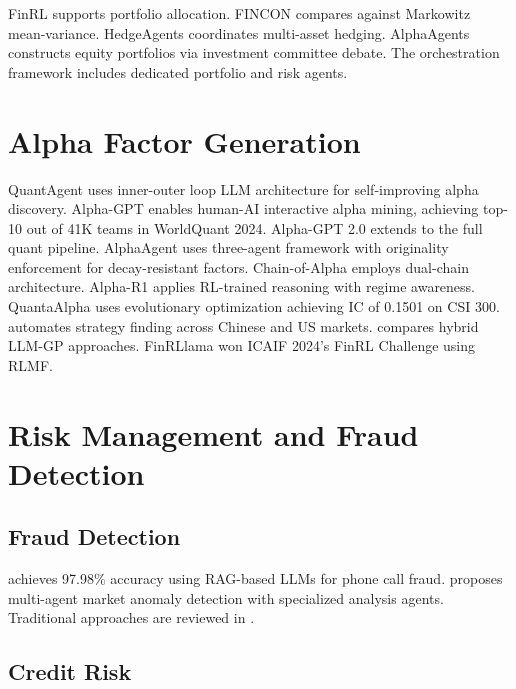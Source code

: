 \documentclass[12pt]{report}
\begin{document}
FinRL \citep{liu2021finrl} supports portfolio allocation. FINCON \citep{yu2024fincon} compares against Markowitz mean-variance. HedgeAgents \citep{li2025hedgeagents} coordinates multi-asset hedging. AlphaAgents \citep{zhao2025alphaagents} constructs equity portfolios via investment committee debate. The orchestration framework \citep{li2025orchestration} includes dedicated portfolio and risk agents.

\section{Alpha Factor Generation}

QuantAgent \citep{wang2024quantagent} uses inner-outer loop LLM architecture for self-improving alpha discovery. Alpha-GPT \citep{wang2025alphagpt} enables human-AI interactive alpha mining, achieving top-10 out of 41K teams in WorldQuant 2024. Alpha-GPT 2.0 \citep{yuan2024alphagpt2} extends to the full quant pipeline. AlphaAgent \citep{tang2025alphaagent} uses three-agent framework with originality enforcement for decay-resistant factors. Chain-of-Alpha \citep{cao2025chainalpha} employs dual-chain architecture. Alpha-R1 \citep{jiang2025alphar1} applies RL-trained reasoning with regime awareness. QuantaAlpha \citep{han2026quantaalpha} uses evolutionary optimization achieving IC of 0.1501 on CSI 300. \citet{kou2024automate} automates strategy finding across Chinese and US markets. \citet{yu2026hybrid} compares hybrid LLM-GP approaches. FinRLlama \citep{grover2025finrllama} won ICAIF 2024's FinRL Challenge using RLMF.

\section{Risk Management and Fraud Detection}

\subsection{Fraud Detection}

\citet{singh2025fraud} achieves 97.98\% accuracy using RAG-based LLMs for phone call fraud. \citet{park2024anomaly} proposes multi-agent market anomaly detection with specialized analysis agents. Traditional approaches are reviewed in \citet{hilal2022financial}.

\subsection{Credit Risk}
\end{document}
